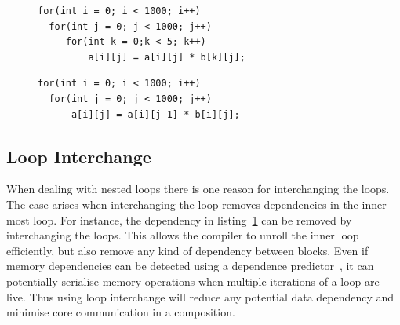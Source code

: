 \begin{figure}[t]
\lstset{language=C,numbersep=4pt}
\begin{center}
\begin{lstlisting}
for(int i = 0; i < 1000; i++)
  for(int j = 0; j < 1000; j++)
     for(int k = 0;k < 5; k++)
         a[i][j] = a[i][j] * b[k][j];
\end{lstlisting}
\end{center}
\vspace{-1em}
\label{lst:small}
\vspace{-2em}
\lstset{language=C,numbersep=4pt}
\begin{center}
\begin{lstlisting}
for(int i = 0; i < 1000; i++)
  for(int j = 0; j < 1000; j++)
      a[i][j] = a[i][j-1] * b[i][j];
\end{lstlisting}
\end{center}
\vspace{-1em}
\label{lst:dep}
\vspace{1em}
\end{figure}


\subsection{Loop Interchange}
When dealing with nested loops there is one reason for interchanging the loops.
The case arises when interchanging the loop removes dependencies in the inner-most loop.
For instance, the dependency in listing~\ref{lst:dep} can be removed by interchanging the loops. 
This allows the compiler to unroll the inner loop efficiently, but also remove any kind of dependency between blocks.
Even if memory dependencies can be detected using a dependence predictor~\cite{chrysos1998storesets}, it can potentially serialise memory operations when multiple iterations of a loop are live.
Thus using loop interchange will reduce any potential data dependency and minimise core communication in a composition.

